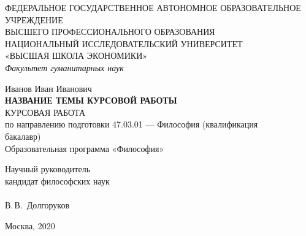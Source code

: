 \thispagestyle{empty}
	\begin{center}
		\small{ФЕДЕРАЛЬНОЕ ГОСУДАРСТВЕННОЕ АВТОНОМНОЕ ОБРАЗОВАТЕЛЬНОЕ \\
        УЧРЕЖДЕНИЕ \\
        ВЫСШЕГО ПРОФЕССИОНАЛЬНОГО ОБРАЗОВАНИЯ \\
        НАЦИОНАЛЬНЫЙ ИССЛЕДОВАТЕЛЬСКИЙ УНИВЕРСИТЕТ \\
        «ВЫСШАЯ ШКОЛА ЭКОНОМИКИ»} \\		
      \textit{Факультет гуманитарных наук}
		\vspace{0.5cm}	
	\end{center}	
	\vfill
		\begin{center}
		Иванов Иван Иванович \\
		\textbf{НАЗВАНИЕ ТЕМЫ КУРСОВОЙ РАБОТЫ}\\
		КУРСОВАЯ РАБОТА\\
		по направлению подготовки 47.03.01 — Философия (квалификация \\
бакалавр) \\
\vspace{0.3cm}
Образовательная программа «Философия»
	\end{center}
	\vfill

	\hfill
	\begin{flushright}
		    Научный руководитель\\
		кандидат философских наук \\
		 \underline{\hspace{5.5cm}} \\
	    В.\,В.~Долгоруков	
	\end{flushright}
	   
	\bigskip
	
	\vfill
	
	\begin{center}
		Москва, 2020
	\end{center}
	
\newpage